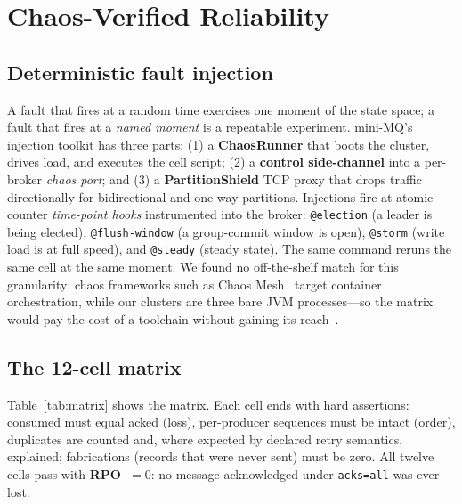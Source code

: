 \documentclass[letterpaper,twocolumn,10pt]{article}
\begin{document}
\section{Chaos-Verified Reliability}
\label{sec:chaos}

\subsection{Deterministic fault injection}
A fault that fires at a random time exercises one moment of the state
space; a fault that fires at a \emph{named moment} is a repeatable
experiment. mini-MQ's injection toolkit has three parts: (1) a
\textbf{ChaosRunner} that boots the cluster, drives load, and executes
the cell script; (2) a \textbf{control side-channel} into a per-broker
\emph{chaos port}; and (3) a \textbf{PartitionShield} TCP proxy that
drops traffic directionally for bidirectional and one-way partitions.
Injections fire at atomic-counter \emph{time-point hooks} instrumented
into the broker: \texttt{@election} (a leader is being elected),
\texttt{@flush-window} (a group-commit window is open),
\texttt{@storm} (write load is at full speed), and \texttt{@steady}
(steady state). The same command reruns the same cell at the same
moment. We found no off-the-shelf match for this granularity: chaos
frameworks such as Chaos Mesh~\cite{basiri16chaos} target container
orchestration, while our clusters are three bare JVM processes---so the
matrix would pay the cost of a toolchain without gaining its
reach~\cite{netflix11simian}.

\subsection{The 12-cell matrix}
Table~\ref{tab:matrix} shows the matrix. Each cell ends with hard
assertions: consumed must equal acked (loss), per-producer sequences
must be intact (order), duplicates are counted and, where expected by
declared retry semantics, explained; fabrications (records that were
never sent) must be zero. All twelve cells pass with
\textbf{RPO~$=0$}: no message acknowledged under \texttt{acks=all} was
ever lost.
\end{document}
